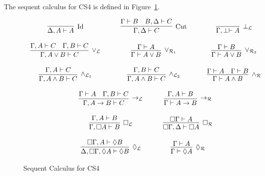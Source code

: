 \documentclass{article}
\begin{document}
The sequent calculus for CS4 is defined in Figure~\ref{fig:CS4-seq}.
\begin{figure}
  \begin{center}
    \begin{math}
      \begin{array}{c}
        \begin{array}{cccccccc}
          \infer[\text{Id}]{\Delta,A \vdash A}{
            \,
          }
          & \quad &
          \infer[\text{Cut}]{\Gamma,\Delta \vdash C}{
            \Gamma \vdash B
            &
            B,\Delta \vdash C
          }
          & \quad & 
          \infer[\perp_{\mathcal{L}}]{\Gamma,\perp \vdash A}{
            \,
          }\\\\
          \infer[\lor_{\mathcal{L}}]{\Gamma,A \lor B \vdash C}{
            \Gamma,A \vdash C
            &
            \Gamma,B \vdash C
          }
          & \quad &
          \infer[\lor_{\mathcal{R}_1}]{\Gamma \vdash A \lor B}{
            \Gamma \vdash A
          }
          & \quad &
          \infer[\lor_{\mathcal{R}_2}]{\Gamma \vdash A \lor B}{
            \Gamma \vdash B
          }\\\\
          \infer[\land_{\mathcal{L}_1}]{\Gamma,A \land B \vdash C}{
            \Gamma,A \vdash C
          }
          & \quad &
          \infer[\land_{\mathcal{L}_2}]{\Gamma,A \land B \vdash C}{
            \Gamma,B \vdash C
          }
          & \quad &
          \infer[\land_{\mathcal{R}}]{\Gamma \vdash A \land B}{
            \Gamma \vdash A
            &
            \Gamma \vdash B
          }\\\\
          
        \end{array}
        \\
        \begin{array}{cccccccc}
          \infer[\to_{\mathcal{L}}]{\Gamma,A \to B \vdash C}{
            \Gamma \vdash A
            &
            \Gamma,B \vdash C
          }
          & \quad &
          \infer[\to_{\mathcal{R}}]{\Gamma \vdash A \to B}{
            \Gamma, A \vdash B
          }\\\\
          \infer[\Box_{\mathcal{L}}]{\Gamma, \Box A \vdash B}{
            \Gamma,A \vdash B
          }
          & \quad &
          \infer[\Box_{\mathcal{R}}]{\Box\Gamma,\Delta \vdash \Box A}{
            \Box \Gamma \vdash A
          }\\\\
          \infer[\Diamond_{\mathcal{L}}]{\Delta,\Box\Gamma,\Diamond A \vdash \Diamond B}{
            \Box\Gamma,A \vdash \Diamond B
          }
          & \quad &
          \infer[\Diamond_{\mathcal{R}}]{\Gamma \vdash \Diamond A}{
            \Gamma \vdash A
          }
        \end{array}        
      \end{array}
    \end{math}
  \end{center}
  \caption{Sequent Calculus for CS4}
  \label{fig:CS4-seq}
\end{figure}
\end{document}
